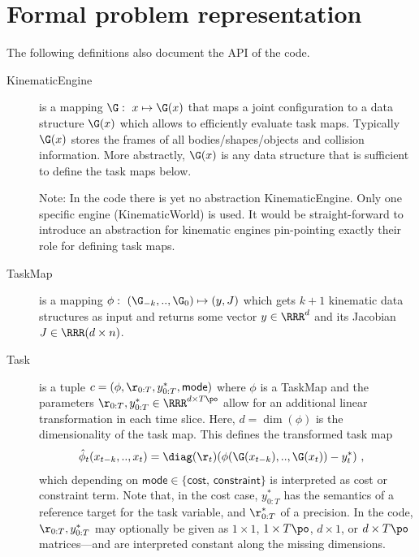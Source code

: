 \documentclass[10pt,fleqn,twoside]{article}
\begin{document}
\section{Formal problem representation}

The following definitions also document the API of the code.
\begin{description}
\item[KinematicEngine] is a mapping $\G:~ x \mapsto \G(x)$
that maps a joint configuration to a data structure $\G(x)$ which
allows to efficiently evaluate task maps. Typically $\G(x)$ stores
the frames of all bodies/shapes/objects and collision
information. More abstractly, $\G(x)$ is any data structure that is
sufficient to define the task maps below.

Note: In the code there is yet no abstraction KinematicEngine. Only
one specific engine (KinematicWorld) is used. It would be
straight-forward to introduce an abstraction for kinematic engines
pin-pointing exactly their role for defining task maps.

\item[TaskMap] is a mapping $\phi:~ (\G_{-k},..,\G_0) \mapsto
(y,J)$ which gets $k+1$ kinematic data structures as input and returns
some vector $y\in\RRR^d$ and its Jacobian $J\in\RRR(d\times n)$.

\item[Task] is a tuple $c=(\phi, \r_{0:T},
 y^*_{0:T},\textsf{mode})$ where $\phi$ is a TaskMap and the
parameters $\r_{0:T},y^*_{0:T} \in\RRR^{d\times T\po}$ allow for an
additional linear transformation in each time slice. Here,
$d=\dim(\phi)$ is the dimensionality of the task map. This defines the
transformed task map
\begin{align}
\hat\phi_t(x_{t-k},..,x_t)
& = \diag(\r_t) (\phi(\G(x_{t-k}),..,\G(x_t)) - y^*_t) ~,
\end{align}
which depending on $\textsf{mode}\in\{\textsf{cost, constraint}\}$ is
interpreted as cost or constraint term. Note that, in the cost case,
$y^*_{0:T}$ has the semantics of a reference target for the task
variable, and $\r^*_{0:T}$ of a precision. In the code,
$\r_{0:T},y^*_{0:T}$ may optionally be given as $1\times 1$, $1\times
T\po$, $d\times 1$, or $d\times T\po$ matrices---and are interpreted
constant along the missing dimensions.


\end{description}
\end{document}
